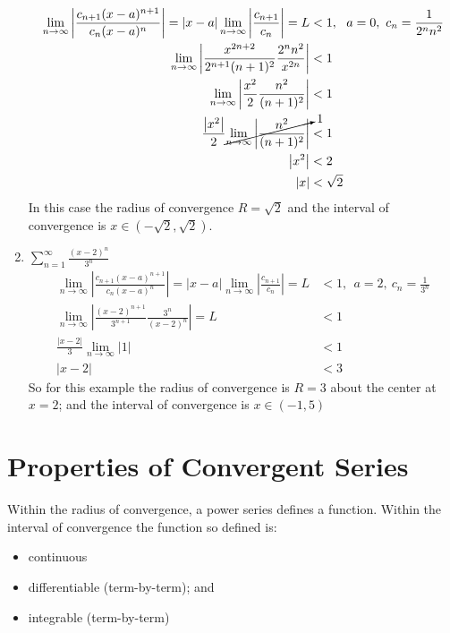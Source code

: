 \begin{enumerate}
\begin{align*}
\lim_{n \to\infty} \left|\frac{c_{n+1}(x-a)^{n+1}}{c_n(x-a)^n} \right| = |x-a| \lim_{n \to\infty} \left|\frac{c_{n+1}}{c_n} \right| = L &< 1, \ \ a=0, \ c_n=\frac{1}{2^n n^2} \\
\lim_{n \to\infty}\left|\frac{x^{2n+2}}{2^{n+1}(n+1)^2} \frac{2^n n^2}{x^{2n}} \right| &< 1 \\
\lim_{n \to\infty} \left|\frac{x^2}{2} \frac{n^2}{(n+1)^2} \right| &< 1 \\
\frac{\left|x^2 \right|}{2} \cancelto{1}{\lim_{n \to\infty}\left|\frac{n^2}{(n+1)^2} \right|} &< 1 \\
\left|x^2\right| &< 2 \\
|x| &< \sqrt{2}
\end{align*}
In this case the radius of convergence $R=\sqrt{2}$ and the interval of convergence is $x\in(-\sqrt{2},\sqrt{2})$.

\vspace{2.0cm}

\item $\sum\limits_{n=1}^{\infty} \frac{\left(x-2 \right)^n}{3^n}$ 
\begin{align*}
\lim_{n \to\infty} \left|\frac{c_{n+1}(x-a)^{n+1}}{c_n(x-a)^n} \right| = |x-a| \lim_{n \to\infty} \left|\frac{c_{n+1}}{c_n} \right| = L &< 1, \ \ a=2, \ c_n=\frac{1}{3^n} \\
\lim_{n \to\infty} \left|\frac{\left(x-2\right)^{n+1}}{3^{n+1}} \frac{3^n}{\left(x-2 \right)^n}\right| = L &< 1 \\
\frac{\left|x-2 \right|}{3} \lim_{n \to\infty}\left|1 \right| &< 1 \\
|x-2| &< 3
\end{align*}
So for this example the radius of convergence is $R=3$ about the center at $x=2$; and the interval of convergence is $x \in (-1,5)$
\end{enumerate}

\section{Properties of Convergent Series}
Within the radius of convergence, a power series defines a function.  Within the interval of convergence the function so defined is:
\begin{itemize}
\item continuous 
\item differentiable (term-by-term); and
\item integrable (term-by-term)
\end{itemize}


